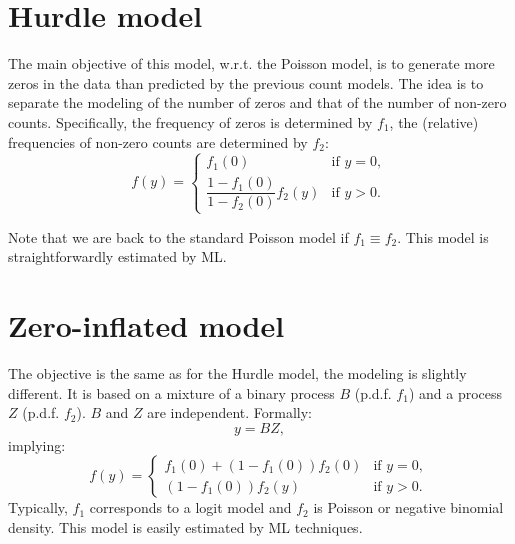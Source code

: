 \documentclass[
  12pt,
]{book}
\theoremstyle{definition}
\theoremstyle{definition}
\theoremstyle{definition}
\theoremstyle{definition}
\theoremstyle{remark}
\begin{document}
\hypertarget{hurdle-model}{%
\section{Hurdle model}\label{hurdle-model}}

The main objective of this model, w.r.t. the Poisson model, is to generate more zeros in the data than predicted by the previous count models. The idea is to separate the modeling of the number of zeros and that of the number of non-zero counts. Specifically, the frequency of zeros is determined by \(f_1\), the (relative) frequencies of non-zero counts are determined by \(f_2\):
\[
f(y) = \left\{
\begin{array}{lll}
f_1(0) & \mbox{if $y=0$},\\
\dfrac{1-f_1(0)}{1-f_2(0)}f_2(y) & \mbox{if $y>0$}.
\end{array}
\right.
\]

Note that we are back to the standard Poisson model if \(f_1 \equiv f_2\). This model is straightforwardly estimated by ML.

\hypertarget{zero-inflated-model}{%
\section{Zero-inflated model}\label{zero-inflated-model}}

The objective is the same as for the Hurdle model, the modeling is slightly different. It is based on a mixture of a binary process \(B\) (p.d.f. \(f_1\)) and a process \(Z\) (p.d.f. \(f_2\)). \(B\) and \(Z\) are independent. Formally:
\[
y = B Z,
\]
implying:
\[
f(y) = \left\{
\begin{array}{lll}
f_1(0) + (1-f_1(0))f_2(0) & \mbox{if $y=0$},\\
(1-f_1(0))f_2(y) & \mbox{if $y>0$}.
\end{array}
\right.
\]
Typically, \(f_1\) corresponds to a logit model and \(f_2\) is Poisson or negative binomial density. This model is easily estimated by ML techniques.
\end{document}
